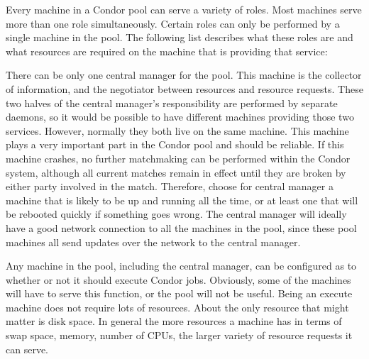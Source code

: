 Every machine in a Condor pool can serve a variety of roles.  Most
machines serve more than one role simultaneously.  Certain roles can
only be performed by a single machine in the pool.  The following list
describes what these roles are and what resources are required on the
machine that is providing that service:

\begin{description} 

\item[Central Manager] There can be only one central manager for the pool.
This machine is the collector of information, and the negotiator
between resources and resource requests.  These two halves of the
central manager's responsibility are performed by separate daemons, so
it would be possible to have different machines providing those two
services.  However, normally they both live on the same machine.  This
machine plays a very important part in the Condor pool and should be
reliable.  If this machine crashes, no further matchmaking can be
performed within the Condor system,
although all current matches remain in effect until they are broken 
by either party involved in the match.
Therefore, choose for central manager
a machine that is likely to be up and running all the time, 
or at least one that will be rebooted quickly if something goes wrong.
The central manager will
ideally have a good network connection to all the
machines in the pool, since these pool machines all send updates over 
the network to the central manager. 


\item[Execute] Any machine in the pool, 
including the central manager, 
can be configured as to whether or not it should execute Condor jobs.
Obviously, some of the machines will have to serve this
function, or the pool will not be useful.
Being an execute machine does not require lots of resources.  
About the only resource that might matter is disk space.
In general the
more resources a machine has in terms of swap space, memory, number of CPUs, 
the larger variety of resource requests it can serve.


\end{description}
